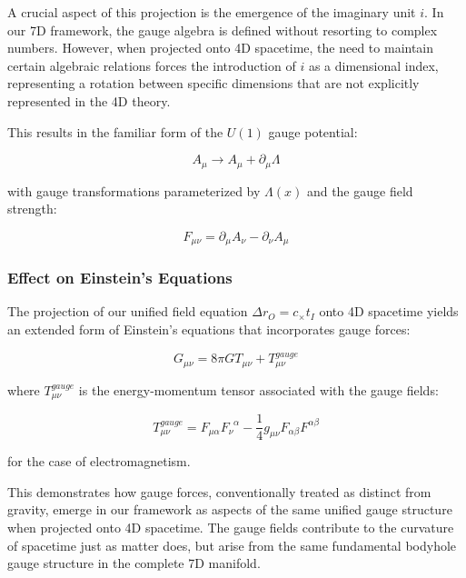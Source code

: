 \documentclass{article}
\begin{document}
A crucial aspect of this projection is the emergence of the imaginary unit $i$. In our 7D framework, the gauge algebra is defined without resorting to complex numbers. However, when projected onto 4D spacetime, the need to maintain certain algebraic relations forces the introduction of $i$ as a dimensional index, representing a rotation between specific dimensions that are not explicitly represented in the 4D theory.

This results in the familiar form of the $U(1)$ gauge potential:

\begin{equation}
A_{\mu} \rightarrow A_{\mu} + \partial_{\mu} \Lambda
\end{equation}

with gauge transformations parameterized by $\Lambda(x)$ and the gauge field strength:

\begin{equation}
F_{\mu\nu} = \partial_{\mu} A_{\nu} - \partial_{\nu} A_{\mu}
\end{equation}

\subsubsection{Effect on Einstein's Equations}

The projection of our unified field equation $\Delta r_O = c_{\times} t_I$ onto 4D spacetime yields an extended form of Einstein's equations that incorporates gauge forces:

\begin{equation}
G_{\mu\nu} = 8\pi G T_{\mu\nu} + T^{gauge}_{\mu\nu}
\end{equation}

where $T^{gauge}_{\mu\nu}$ is the energy-momentum tensor associated with the gauge fields:

\begin{equation}
T^{gauge}_{\mu\nu} = F_{\mu\alpha} F_{\nu}^{\;\;\alpha} - \frac{1}{4} g_{\mu\nu} F_{\alpha\beta} F^{\alpha\beta}
\end{equation}

for the case of electromagnetism.

This demonstrates how gauge forces, conventionally treated as distinct from gravity, emerge in our framework as aspects of the same unified gauge structure when projected onto 4D spacetime. The gauge fields contribute to the curvature of spacetime just as matter does, but arise from the same fundamental bodyhole gauge structure in the complete 7D manifold.
\end{document}
